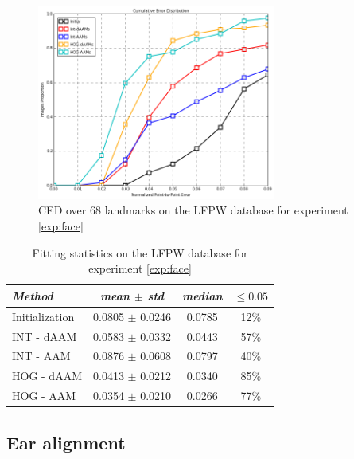 \begin{figure}[h]
\centering
\includegraphics[width=0.7\textwidth]{resources/Fig_Alignment/face_ced}
\caption{CED over 68 landmarks on the LFPW database for experiment \ref{exp:face}}
\label{fig:face_ced}
\end{figure}

\begin{table}[h]
\small
\centering
\begin{tabular}{|l|c|c|c|}
\hline
\emph{Method}   & \emph{mean $\pm$ std} & \emph{median} & $\leq 0.05$\\
\hline\hline
Initialization  & 0.0805 $\pm$ 0.0246 & 0.0785 & 12\%\\
INT - dAAM      & 0.0583 $\pm$ 0.0332 & 0.0443 & 57\%\\
INT - AAM       & 0.0876 $\pm$ 0.0608 & 0.0797 & 40\%\\
HOG - dAAM      & 0.0413 $\pm$ 0.0212 & 0.0340 & 85\%\\
HOG - AAM       & 0.0354 $\pm$ 0.0210 & 0.0266 & 77\%\\
\hline
\end{tabular}
\caption{Fitting statistics on the LFPW database for experiment \ref{exp:face}}
\label{tab:face_stats}
\end{table}

\subsection{Ear alignment}
\label{exp:ear}

